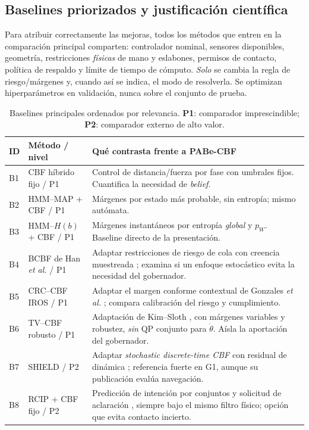 \documentclass[10pt,a4paper,twocolumn]{article}
\begin{document}
\subsection{Baselines priorizados y justificación científica}
Para atribuir correctamente las mejoras, todos los métodos que entren en la comparación principal comparten: controlador nominal, sensores disponibles, geometría, restricciones \emph{físicas} de mano y eslabones, permisos de contacto, política de respaldo y límite de tiempo de cómputo. \emph{Solo} se cambia la regla de riesgo/márgenes y, cuando así se indica, el modo de resolverla. Se optimizan hiperparámetros en validación, nunca sobre el conjunto de prueba.

\begin{table}[!t]
\centering\footnotesize
\caption{Baselines principales ordenados por relevancia. \textbf{P1}: comparador imprescindible; \textbf{P2}: comparador externo de alto valor.}
\vspace{2pt}
\begin{tabularx}{\textwidth}{@{}p{12mm}p{38mm}X@{}}
\toprule
\textbf{ID} & \textbf{Método / nivel} & \textbf{Qué contrasta frente a PABe-CBF}\\
\midrule
B1 & CBF híbrido fijo / P1 & Control de distancia/fuerza por fase con umbrales fijos. Cuantifica la necesidad de \emph{belief}. \\
B2 & HMM--MAP + CBF / P1 & Márgenes por estado más probable, sin entropía; mismo autómata. \\
B3 & HMM--$H(b)$ + CBF / P1 & Márgenes instantáneos por entropía \emph{global} y $p_W$. Baseline directo de la presentación. \\
B4 & BCBF de Han \emph{et al.} / P1 & Adaptar restricciones de riesgo de cola con creencia muestreada \cite{r2}; examina si un enfoque estocástico evita la necesidad del gobernador.\\
B5 & CRC--CBF IROS / P1 & Adaptar el margen conforme contextual de Gonzales \emph{et al.} \cite{r5}; compara calibración del riesgo y cumplimiento.\\
B6 & TV--CBF robusto / P1 & Adaptación de Kim--Sloth \cite{r12}, con márgenes variables y robustez, \emph{sin} QP conjunto para $\dot\theta$. Aísla la aportación del gobernador.\\
B7 & SHIELD / P2 & Adaptar \emph{stochastic discrete-time CBF} con residual de dinámica \cite{r1}; referencia fuerte en G1, aunque su publicación evalúa navegación.\\
B8 & RCIP + CBF fijo / P2 & Predicción de intención por conjuntos y solicitud de aclaración \cite{r18}, siempre bajo el mismo filtro físico; opción que evita contacto incierto.\\
\bottomrule
\end{tabularx}
\label{tab:strongbase}
\end{table}
\end{document}
